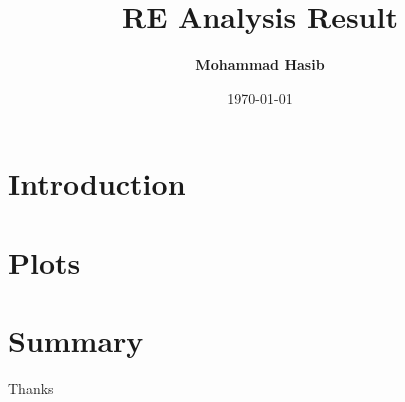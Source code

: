 \documentclass[slidestop,compress,mathserif]{beamer}
\title[RE Plots]{RE Analysis Result}
\author[Mohammad Hasib]{{\bf Mohammad Hasib}\inst{1}}
\institute[Delhi,INDIA]{\inst{1}University of Delhi}
\date[\today]{\today}
\begin{document}
\renewcommand{\inserttotalframenumber}{\pageref{lastslide}}
\begin{frame}
\titlepage
\end{frame}

\section{Introduction}
 
\section{Plots}

\section{Summary}



\label{lastslide}
\begin{frame}[c]
	\begin{center}
	\Huge Thanks
	\end{center}
\end{frame}

\end{document}
